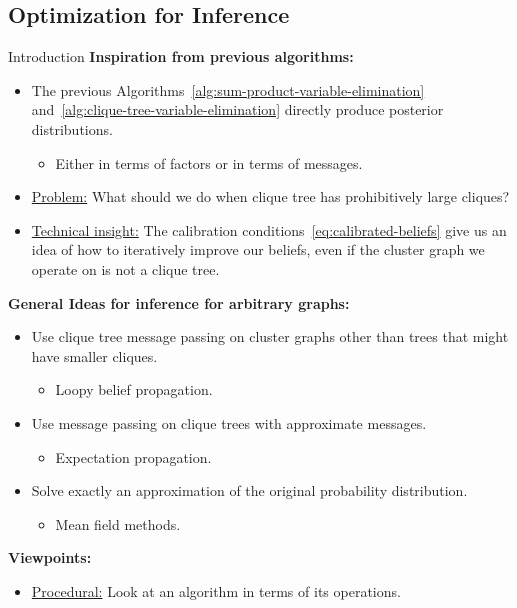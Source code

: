 \subsection{Optimization for Inference}

\begin{frame}{Introduction}
    \textbf{Inspiration from previous algorithms:}
\begin{itemize}
    \item The previous Algorithms~\ref{alg:sum-product-variable-elimination} and~\ref{alg:clique-tree-variable-elimination} directly produce posterior distributions.
    \begin{itemize}
        \pause \item Either in terms of factors or in terms of messages.
    \end{itemize}
    \pause \item \underline{Problem:} What should we do when clique tree has prohibitively large cliques?
    \pause \item \underline{Technical insight:} The calibration conditions~\eqref{eq:calibrated-beliefs} give us an idea of how to iteratively improve our beliefs, even if the cluster graph we operate on is not a clique tree.
\end{itemize}
\pause
\textbf{General Ideas for inference for arbitrary graphs:}
\begin{itemize}
    \pause \item Use clique tree message passing on cluster graphs other than trees that might have smaller cliques.
    \begin{itemize}
        \pause \item Loopy belief propagation.
    \end{itemize}
    \pause \item Use message passing on clique trees with approximate messages.
    \begin{itemize}
        \pause \item Expectation propagation.
    \end{itemize}
    \pause \item Solve exactly an approximation of the original probability distribution.
    \begin{itemize}
        \pause \item Mean field methods.
    \end{itemize}
\end{itemize}
\pause
\textbf{Viewpoints:}
\begin{itemize}
    \pause\item \underline{Procedural:} Look at an algorithm in terms of its operations.

\end{itemize}
\end{frame}
